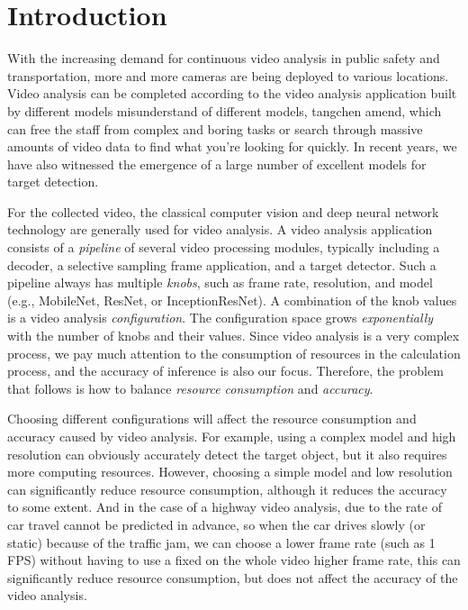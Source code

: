 \section{Introduction}
\label{Section: introduction}
With the increasing demand for continuous video analysis in public safety and transportation, more and more cameras are being deployed to various locations. Video analysis can be completed according to the video analysis application built by different models \textcolor{note}{misunderstand of different models, tangchen amend}, which can free the staff from complex and boring tasks or search through massive amounts of video data to find what you're looking for quickly. In recent years, we have also witnessed the emergence of a large number of excellent models for target detection.

For the collected video, the classical computer vision and deep neural network technology are generally used for video analysis. A video analysis application consists of a \emph{pipeline} of several video processing modules, typically including a decoder, a selective sampling frame application, and a target detector. Such a pipeline always has multiple \emph{knobs}, such as frame rate, resolution, and model (e.g., MobileNet, ResNet, or InceptionResNet). A combination of the knob values is a video analysis \emph{configuration}. The configuration space grows \emph{exponentially} with the number of knobs and their values. Since video analysis is a very complex process, we pay much attention to the consumption of resources in the calculation process, and the accuracy of inference is also our focus. Therefore, the problem that follows is how to balance \emph{resource consumption} and \emph{accuracy}. 

Choosing different configurations will affect the resource consumption and accuracy caused by video analysis. For example, using a complex model and high resolution can obviously accurately detect the target object, but it also requires more computing resources. However, choosing a simple model and low resolution can significantly reduce resource consumption, although it reduces the accuracy to some extent. And in the case of a highway video analysis, due to the rate of car travel cannot be predicted in advance, so when the car drives slowly (or static) because of the traffic jam, we can choose a lower frame rate (such as 1 FPS) without having to use a fixed on the whole video higher frame rate, this can significantly reduce resource consumption, but does not affect the accuracy of the video analysis. 

